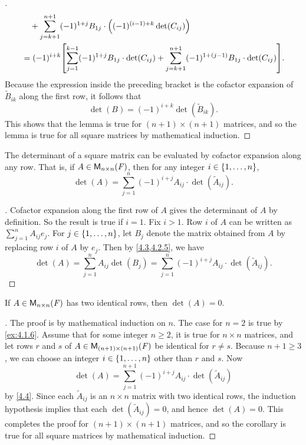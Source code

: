 \begin{proof}[]
\begin{align*}
		        & \quad + \sum_{j = k + 1}^{n + 1} (-1)^{1 + j} B_{1 j} \cdot \pa{(-1)^{(i - 1) + k} \det(C_{i j})}                                                            \\
		        & = (-1)^{i + k} \br{\sum_{j = 1}^{k - 1} (-1)^{1 + j} B_{1 j} \cdot \det(C_{i j}) + \sum_{j = k + 1}^{n + 1} (-1)^{1 + (j - 1)} B_{1 j} \cdot \det(C_{i j})}.
	\end{align*}
	Because the expression inside the preceding bracket is the cofactor expansion of \(\tilde{B}_{i k}\) along the first row, it follows that
	\[
		\det(B) = (-1)^{i + k} \det(\tilde{B}_{i k}).
	\]
	This shows that the lemma is true for \((n + 1) \times (n + 1)\) matrices, and so the lemma is true for all square matrices by mathematical induction.
\end{proof}

\begin{thm}\label{4.4}
	The determinant of a square matrix can be evaluated by cofactor expansion along any row.
	That is, if \(A \in \mathsf{M}_{{n} \times n}({\mathit{F}})\), then for any integer \(i \in \left\lbrace1, \dots, n\right\rbrace\),
	\[
		\det(A) = \sum_{j = 1}^n (-1)^{i + j} A_{i j} \cdot \det(\tilde{A}_{i j}).
	\]
\end{thm}

\begin{proof}[]
	Cofactor expansion along the first row of \(A\) gives the determinant of \(A\) by definition.
	So the result is true if \(i = 1\).
	Fix \(i > 1\).
	Row \(i\) of \(A\) can be written as \(\sum_{j = 1}^n A_{i j} e_j\).
	For \(j \in \left\lbrace1, \dots, n\right\rbrace\), let \(B_j\) denote the matrix obtained from \(A\) by replacing row \(i\) of \(A\) by \(e_j\).
	Then by \cref{4.3,4.2.5}, we have
	\[
		\det(A) = \sum_{j = 1}^n A_{i j} \det(B_j) = \sum_{j = 1}^n (-1)^{i + j} A_{i j} \cdot \det(\tilde{A}_{i j}).
	\]
\end{proof}

\begin{cor}\label{4.2.6}
	If \(A \in \mathsf{M}_{{n} \times n}({\mathit{F}})\) has two identical rows, then \(\det(A) = 0\).
\end{cor}

\begin{proof}[]
	The proof is by mathematical induction on \(n\).
	The case for \(n = 2\) is true by \cref{ex:4.1.6}.
	Assume that for some integer \(n \geq 2\), it is true for \(n \times n\) matrices, and let rows \(r\) and \(s\) of \(A \in \mathsf{M}_{{(n + 1)} \times (n + 1)}({\mathit{F}})\) be identical for \(r \neq s\).
	Because \(n + 1 \geq 3\), we can choose an integer \(i \in \left\lbrace1, \dots, n\right\rbrace\) other than \(r\) and \(s\).
	Now
	\[
		\det(A) = \sum_{j = 1}^{n + 1} (-1)^{i + j} A_{i j} \cdot \det(\tilde{A}_{i j})
	\]
	by \cref{4.4}.
	Since each \(\tilde{A}_{i j}\) is an \(n \times n\) matrix with two identical rows, the induction hypothesis implies that each \(\det(\tilde{A}_{i j}) = 0\), and hence \(\det(A) = 0\).
	This completes the proof for \((n + 1) \times (n + 1)\) matrices, and so the corollary is true for all square matrices by mathematical induction.
\end{proof}

